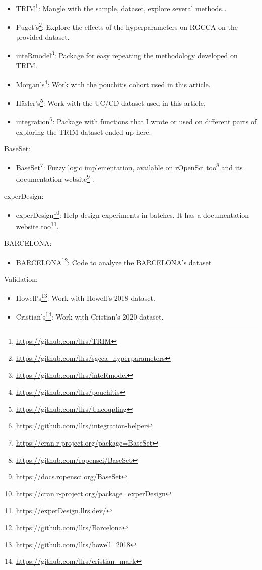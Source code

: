 \documentclass[
  a4paper,
]{book}
\DeclareRobustCommand{\href}[2]{#2\footnote{\url{#1}}}
\providecommand{\tightlist}{%
  \setlength{\itemsep}{0pt}\setlength{\parskip}{0pt}}
\begin{document}
\begin{itemize}
\tightlist
\item
  \href{https://github.com/llrs/TRIM}{TRIM}: Mangle with the sample, dataset, explore several methods\ldots{}
\item
  \href{https://github.com/llrs/sgcca_hyperparameters}{Puget's}: Explore the effects of the hyperparameters on RGCCA on the provided dataset.
\item
  \href{https://github.com/llrs/inteRmodel}{inteRmodel}: Package for easy repeating the methodology developed on TRIM.
\item
  \href{https://github.com/llrs/pouchitis}{Morgan's}: Work with the pouchitis cohort used in this article.
\item
  \href{https://github.com/llrs/Uncoupling}{Häsler's}: Work with the UC/CD dataset used in this article.
\item
  \href{https://github.com/llrs/integration-helper}{integration}: Package with functions that I wrote or used on different parts of exploring the TRIM dataset ended up here.
\end{itemize}

BaseSet:

\begin{itemize}
\tightlist
\item
  \href{https://cran.r-project.org/package=BaseSet}{BaseSet}: Fuzzy logic implementation, available on \href{https://github.com/ropensci/BaseSet}{rOpenSci too} and its \href{https://docs.ropensci.org/BaseSet}{documentation website} .
\end{itemize}

experDesign:

\begin{itemize}
\tightlist
\item
  \href{https://cran.r-project.org/package=experDesign}{experDesign}: Help design experiments in batches. It has a \href{https://experDesign.llrs.dev/}{documentation website too}.
\end{itemize}

BARCELONA:

\begin{itemize}
\tightlist
\item
  \href{https://github.com/llrs/Barcelona}{BARCELONA}: Code to analyze the BARCELONA's dataset
\end{itemize}

Validation:

\begin{itemize}
\tightlist
\item
  \href{https://github.com/llrs/howell_2018}{Howell's}: Work with Howell's 2018 dataset.
\item
  \href{https://github.com/llrs/cristian_mark}{Cristian's}: Work with Cristian's 2020 dataset.
\end{itemize}
\end{document}
